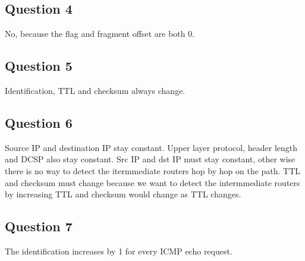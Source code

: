 \documentclass[titlepage, paper=a4, fontsize=11pt]{scrartcl} %
\numberwithin{equation}{section} %
\numberwithin{figure}{section} %
\numberwithin{table}{section} %
\begin{document}
\subsection*{Question 4}
No, because the flag and fragment offset are both 0. \\

\subsection*{Question 5}
Identification, TTL and checksum always change. \\

\subsection*{Question 6}
Source IP and destination IP stay constant. Upper layer protocol, header length and DCSP also stay constant. Src IP and dst IP must stay constant, other wise there is no way to detect the itermmediate routers hop by hop on the path. TTL and checksum must change because we want to detect the intermmediate routers by increasing TTL and checksum would change as TTL changes. \\

\subsection*{Question 7}
The identification increases by 1 for every ICMP echo request. \\
\end{document}
